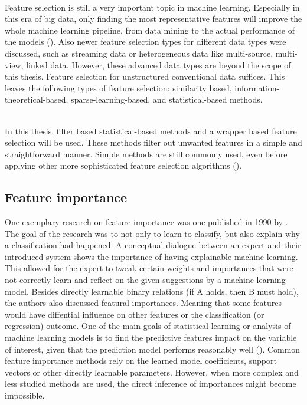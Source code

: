 ~\\Feature selection is still a very important topic in machine learning. Especially in this era of big data, only finding the most representative features will improve the whole machine learning pipeline, from data mining to the actual performance of the models (\cite{Li2017-vo}). 
Also newer feature selection types for different data types were discussed, such as streaming data or heterogeneous data like multi-source, multi-view, linked data. However, these advanced data types are beyond the scope of this thesis. Feature selection for unstructured conventional data suffices. This leaves the following types of feature selection: similarity based, information-theoretical-based, sparse-learning-based, and statistical-based methods.

~\\In this thesis, filter based statistical-based methods and a wrapper based feature selection will be used. These methods filter out unwanted features in a simple and straightforward manner. Simple methods are still commonly used, even before applying other more sophisticated feature selection algorithms (\cite{Li2017-vo}).

\subsection{Feature importance}
One exemplary research on feature importance was one published in 1990 by \cite{Porter1990-is}. The goal of the research was to not only to learn to classify, but also explain why a classification had happened. A conceptual dialogue between an expert and their introduced system shows the importance of having explainable machine learning. This allowed for the expert to tweak certain weights and importances that were not correctly learn and reflect on the given suggestions by a machine learning model. Besides directly learnable binary relations (if A holds, then B must hold), the authors also discussed featural importances. Meaning that some features would have diffential influence on other features or the classification (or regression) outcome. 
One of the main goals of statistical learning or analysis of machine learning models is to find the predictive features impact on the variable of interest, given that the prediction model performs reasonably well (\cite{Altmann2010-lq}). Common feature importance methods rely on the learned model coefficients, support vectors or other directly learnable parameters. However, when more complex and less studied methods are used, the direct inference of importances might become impossible. 

